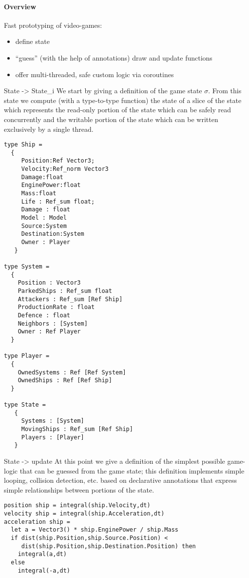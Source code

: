 
\paragraph{Overview}

Fast prototyping of video-games:

\begin{itemize}
\item define state
\item ``guess'' (with the help of annotations) draw and update functions
\item offer multi-threaded, safe custom logic via coroutines
\end{itemize}


State -> State\_i
We start by giving a definition of the game state $\sigma$. From this state we compute (with a type-to-type function) the state of a slice of the state which represents the read-only portion of the state which can be safely read concurrently and the writable portion of the state which can be written exclusively by a single thread.

\begin{lstlisting}
type Ship =
  {  
     Position:Ref Vector3;
     Velocity:Ref_norm Vector3
     Damage:float
     EnginePower:float
     Mass:float
     Life : Ref_sum float;
     Damage : float
     Model : Model
     Source:System
     Destination:System
     Owner : Player
   }
   
type System =
  {
    Position : Vector3
    ParkedShips : Ref_sum float
    Attackers : Ref_sum [Ref Ship]
    ProductionRate : float
    Defence : float
    Neighbors : [System]
    Owner : Ref Player
  }

type Player =
  {
    OwnedSystems : Ref [Ref System]
    OwnedShips : Ref [Ref Ship]
  }    

type State = 
   {  
     Systems : [System]
     MovingShips : Ref_sum [Ref Ship]
     Players : [Player]
   }
\end{lstlisting}


State -> update
At this point we give a definition of the simplest possible game-logic that can be guessed from the game state; this definition implements simple looping, collision detection, etc. based on declarative annotations that express simple relationships between portions of the state.

\begin{lstlisting}
position ship = integral(ship.Velocity,dt)
velocity ship = integral(ship.Acceleration,dt)
acceleration ship =
  let a = Vector3() * ship.EnginePower / ship.Mass
  if dist(ship.Position,ship.Source.Position) <
     dist(ship.Position,ship.Destination.Position) then
    integral(a,dt)
  else
    integral(-a,dt)
\end{lstlisting}

